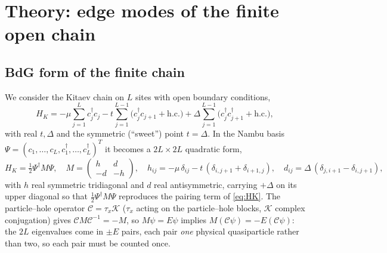 
\section{Theory: edge modes of the finite open chain}
\label{sec:theory}

\subsection{BdG form of the finite chain}
\label{sec:bdg}
We consider the Kitaev chain on $L$ sites with open boundary conditions,
\begin{equation}
  H_K = -\mu \sum_{j=1}^{L} c_j^\dagger c_j
        - t \sum_{j=1}^{L-1} \bigl(c_j^\dagger c_{j+1} + \mathrm{h.c.}\bigr)
        + \Delta \sum_{j=1}^{L-1} \bigl(c_j^\dagger c_{j+1}^\dagger + \mathrm{h.c.}\bigr),
  \label{eq:HK}
\end{equation}
with real $t,\Delta$ and the symmetric (``sweet'') point $t = \Delta$. In the
Nambu basis $\Psi = (c_1,\dots,c_L,c_1^\dagger,\dots,c_L^\dagger)^T$ it becomes
a $2L \times 2L$ quadratic form,
\begin{equation}
  H_K = \tfrac12 \Psi^\dagger M \Psi, \quad
  M = \begin{pmatrix} h & d \\ -d & -h \end{pmatrix}, \quad
  h_{ij} = -\mu\,\delta_{ij} - t\,(\delta_{i,j+1} + \delta_{i+1,j}), \quad
  d_{ij} = \Delta\,(\delta_{j,i+1} - \delta_{i,j+1}),
  \label{eq:bdg}
\end{equation}
with $h$ real symmetric tridiagonal and $d$ real antisymmetric, carrying
$+\Delta$ on its upper diagonal so that $\tfrac12\Psi^\dagger M \Psi$
reproduces the pairing term of \eqref{eq:HK}. The particle--hole operator
$\mathcal{C} = \tau_x \mathcal{K}$ ($\tau_x$ acting on the particle--hole
blocks, $\mathcal{K}$ complex conjugation) gives
$\mathcal{C} M \mathcal{C}^{-1} = -M$, so $M\psi = E\psi$ implies
$M(\mathcal{C}\psi) = -E(\mathcal{C}\psi)$: the $2L$ eigenvalues come in
$\pm E$ pairs, each pair \emph{one} physical quasiparticle rather than two, so
each pair must be counted once.

